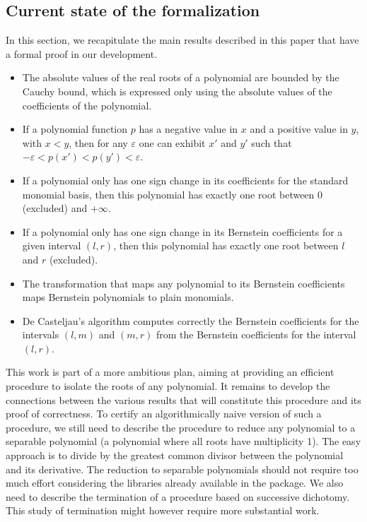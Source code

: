 \documentclass{mscs}
\begin{document}


\subsection{Current state of the formalization}
In this section, we recapitulate the main results described in this paper
that have a formal proof in our development.
\begin{itemize}
\item The absolute values of the real roots of a polynomial are bounded
  by the Cauchy bound, which is expressed only using the absolute
  values of the coefficients of the polynomial.
\item If a polynomial function \(p\)
has a negative value in \(x\) and a positive
value in \(y\), with \(x < y\), then for any \(\varepsilon\) one can
exhibit \(x'\) and \(y'\) such that \(-\varepsilon < p(x') < p(y') < \varepsilon\).
\item If a polynomial only has one sign change in its coefficients for the
standard monomial basis, then this polynomial has exactly one root between
\(0\) (excluded) and \(+\infty\).
\item If a polynomial only has one sign change in its Bernstein coefficients
for a given interval \((l,r)\), then this polynomial has exactly one root
between \(l\) and \(r\) (excluded).
\item The transformation that maps any polynomial to its Bernstein
  coefficients maps Bernstein polynomials to plain monomials.
\item De Casteljau's algorithm computes correctly the Bernstein coefficients
for the intervals \((l,m)\) and \((m,r)\) from the Bernstein coefficients
for the interval \((l,r)\).
\end{itemize}
This work is part of a more ambitious plan, aiming at providing an
efficient procedure
to isolate the roots of any polynomial.  It remains to develop the connections
between the various results that will constitute this procedure and its proof
of correctness. To certify an algorithmically naive version of such a
procedure, we still need to describe the procedure to reduce any
polynomial to a separable polynomial (a polynomial where all roots
have multiplicity 1).  The easy approach is to divide by the greatest common divisor
between the polynomial and its derivative. The reduction to separable
polynomials should not require too much effort considering the
libraries already available in the \ssr{} package.    We also need to describe the termination
of a procedure based on successive dichotomy.  This study of
termination might however require more substantial work.
\end{document}
